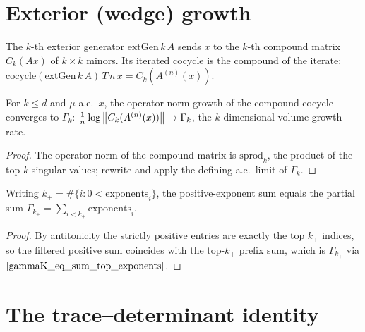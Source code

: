 \section{Exterior (wedge) growth}

\begin{definition}\label{extGen}
  \leanok
  The $k$-th exterior generator $\mathrm{extGen}\,k\,A$ sends $x$ to the $k$-th compound matrix $C_k(A x)$ of $k\times k$ minors. Its iterated cocycle is the compound of the iterate: $\mathrm{cocycle}(\mathrm{extGen}\,k\,A)\,T\,n\,x = C_k(A^{(n)}(x))$.
\end{definition}

\begin{theorem}\label{tendsto_log_opNorm_compound_cocycle}
  \leanok
  For $k \le d$ and $\mu$-a.e.\ $x$, the operator-norm growth of the compound cocycle converges to $\Gamma_k$: $\tfrac1n\log\left\lVert C_k(A^{(n)}(x)) \right\rVert \to \Gamma_k$, the $k$-dimensional volume growth rate.
\end{theorem}
\begin{proof}\leanok
  The operator norm of the compound matrix is $\mathrm{sprod}_k$, the product of the top-$k$ singular values; rewrite and apply the defining a.e.\ limit of $\Gamma_k$.
\end{proof}

\begin{corollary}\label{sumPosExp_eq_gammaK_card_pos}
  \leanok
  Writing $k_+ = \#\{i : 0 < \mathrm{exponents}_i\}$, the positive-exponent sum equals the partial sum $\Gamma_{k_+} = \sum_{i<k_+}\mathrm{exponents}_i$.
\end{corollary}
\begin{proof}\leanok
  By antitonicity the strictly positive entries are exactly the top $k_+$ indices, so the filtered positive sum coincides with the top-$k_+$ prefix sum, which is $\Gamma_{k_+}$ via $\ref{gammaK_eq_sum_top_exponents}$.
\end{proof}

\section{The trace--determinant identity}

